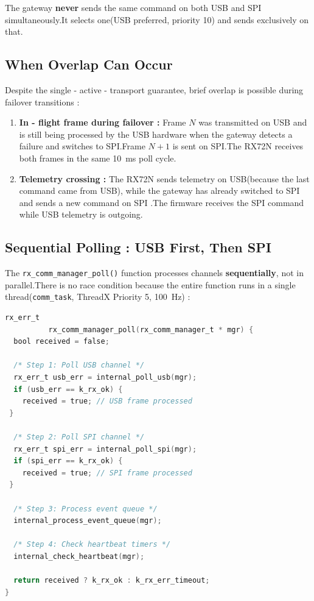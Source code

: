    The gateway \textbf{never} sends the same command on both USB and
        SPI simultaneously.It selects
        one(USB preferred, priority 10) and
    sends exclusively on that.

\subsection{When Overlap Can Occur}

        Despite the single
        - active - transport guarantee,
    brief overlap is possible during failover transitions :

\begin{enumerate}[leftmargin = 1.5em, topsep = 4pt, itemsep = 2pt]
    \item \textbf{In - flight frame during failover :
   } Frame $N$ was transmitted on USB and is still being processed by the USB
    hardware when the gateway detects a failure and switches to SPI.Frame $N
        + 1 $ is sent on SPI.The RX72N receives both frames in the same 10\,
    ms poll cycle.
    \item \textbf{Telemetry crossing :} The RX72N sends telemetry on
    USB(because the last command came from USB),
    while the gateway has already switched to SPI and sends a new command on SPI
        .The firmware receives the SPI command while USB telemetry is outgoing.
\end{enumerate}

\subsection{Sequential Polling : USB First, Then SPI}

The \texttt{rx\_comm\_manager\_poll()} function processes channels \textbf{sequentially},
    not in parallel.There is no race condition because the entire function runs
            in a single
            thread(\texttt{comm\_task}, ThreadX Priority 5, 100\, Hz)
    :

\begin{lstlisting}[language = C, caption = {Sequential channel polling(
                                      rx\_comm\_manager\_poll)}] rx_err_t
          rx_comm_manager_poll(rx_comm_manager_t * mgr) {
  bool received = false;

  /* Step 1: Poll USB channel */
  rx_err_t usb_err = internal_poll_usb(mgr);
  if (usb_err == k_rx_ok) {
    received = true; // USB frame processed
 }

  /* Step 2: Poll SPI channel */
  rx_err_t spi_err = internal_poll_spi(mgr);
  if (spi_err == k_rx_ok) {
    received = true; // SPI frame processed
 }

  /* Step 3: Process event queue */
  internal_process_event_queue(mgr);

  /* Step 4: Check heartbeat timers */
  internal_check_heartbeat(mgr);

  return received ? k_rx_ok : k_rx_err_timeout;
}
\end{lstlisting}

